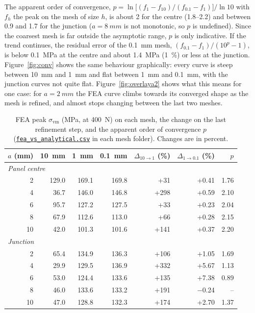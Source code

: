 \documentclass[10pt,a4paper]{article}
\newcommand{\repo}{https://github.com/Shass27/curiosity-perseverance-wheel-fea}
\newcommand{\blob}{\repo/blob/main}
\begin{document}
The apparent order of convergence, $p = \ln\!\big[(f_{1}-f_{10})/(f_{0.1}-f_{1})\big]/\ln 10$ with $f_h$ the peak on the mesh of size $h$, is about 2 for the centre (1.8--2.2) and between 0.9 and 1.7 for the junction ($a = \SI{8}{mm}$ is not monotonic, so $p$ is undefined). Since the coarsest mesh is far outside the asymptotic range, $p$ is only indicative. If the trend continues, the residual error of the \SI{0.1}{mm} mesh, $(f_{0.1}-f_{1})/(10^p-1)$, is below \SI{0.1}{MPa} at the centre and about \SI{1.4}{MPa} (\SI{1}{\percent}) or less at the junction. Figure~\ref{fig:conv} shows the same behaviour graphically: every curve is steep between \SI{10}{mm} and \SI{1}{mm} and flat between \SI{1}{mm} and \SI{0.1}{mm}, with the junction curves not quite flat. Figure~\ref{fig:overlaya2} shows what this means for one case: for $a = \SI{2}{mm}$ the FEA curve climbs towards its converged shape as the mesh is refined, and almost stops changing between the last two meshes.

\begin{table}[htbp]
  \centering
  \caption{FEA peak $\sigma_\text{vm}$ (MPa, at \SI{400}{N}) on each mesh, the change on the last refinement step, and the apparent order of convergence $p$ (\href{\blob/scripts\%20and\%20outputs/tier_1/output}{\texttt{fea\_vs\_analytical.csv}} in each mesh folder). Changes are in percent.}
  \label{tab:conv}
  \begin{tabular}{rrrrrrr}
    \toprule
    $a$ (mm) & \SI{10}{mm} & \SI{1}{mm} & \SI{0.1}{mm} & $\Delta_{10\to1}$ (\%) & $\Delta_{1\to0.1}$ (\%) & $p$ \\
    \midrule
    \multicolumn{7}{l}{\emph{Panel centre}} \\
    2 & 129.0 & 169.1 & 169.8 & +31 & +0.41 & 1.76 \\
    4 & 36.7 & 146.0 & 146.8 & +298 & +0.59 & 2.10 \\
    6 & 95.7 & 127.2 & 127.5 & +33 & +0.23 & 2.04 \\
    8 & 67.9 & 112.6 & 113.0 & +66 & +0.28 & 2.15 \\
    10 & 42.0 & 101.3 & 101.6 & +141 & +0.37 & 2.20 \\
    \midrule
    \multicolumn{7}{l}{\emph{Junction}} \\
    2 & 65.4 & 134.9 & 136.3 & +106 & +1.05 & 1.69 \\
    4 & 29.9 & 129.5 & 136.9 & +332 & +5.67 & 1.13 \\
    6 & 53.0 & 124.4 & 133.6 & +135 & +7.38 & 0.89 \\
    8 & 46.0 & 133.6 & 133.2 & +191 & $-$0.24 & -- \\
    10 & 47.0 & 128.8 & 132.3 & +174 & +2.70 & 1.37 \\
    \bottomrule
  \end{tabular}
\end{table}
\end{document}
